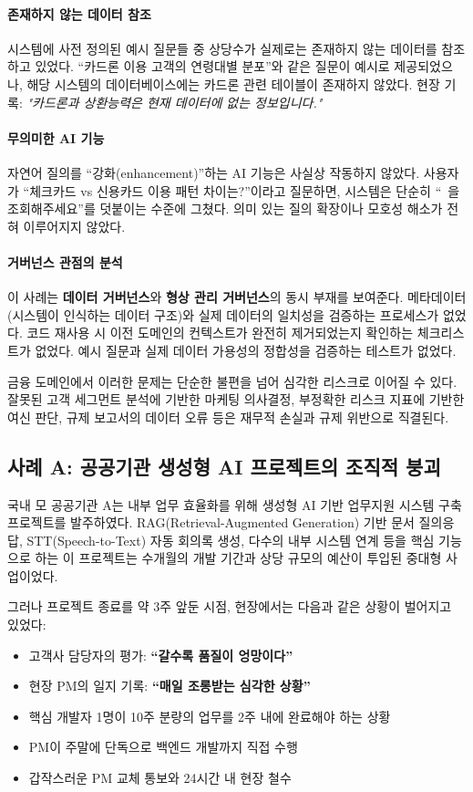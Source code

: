 \paragraph{존재하지 않는 데이터 참조}
시스템에 사전 정의된 예시 질문들 중 상당수가 실제로는 존재하지 않는 데이터를 참조하고 있었다. ``카드론 이용 고객의 연령대별 분포''와 같은 질문이 예시로 제공되었으나, 해당 시스템의 데이터베이스에는 카드론 관련 테이블이 존재하지 않았다. 현장 기록: \textit{"카드론과 상환능력은 현재 데이터에 없는 정보입니다."}

\paragraph{무의미한 AI 기능}
자연어 질의를 ``강화(enhancement)''하는 AI 기능은 사실상 작동하지 않았다. 사용자가 ``체크카드 vs 신용카드 이용 패턴 차이는?''이라고 질문하면, 시스템은 단순히 ``~을 조회해주세요''를 덧붙이는 수준에 그쳤다. 의미 있는 질의 확장이나 모호성 해소가 전혀 이루어지지 않았다.

\paragraph{거버넌스 관점의 분석}
이 사례는 \textbf{데이터 거버넌스}와 \textbf{형상 관리 거버넌스}의 동시 부재를 보여준다. 메타데이터(시스템이 인식하는 데이터 구조)와 실제 데이터의 일치성을 검증하는 프로세스가 없었다. 코드 재사용 시 이전 도메인의 컨텍스트가 완전히 제거되었는지 확인하는 체크리스트가 없었다. 예시 질문과 실제 데이터 가용성의 정합성을 검증하는 테스트가 없었다.

금융 도메인에서 이러한 문제는 단순한 불편을 넘어 심각한 리스크로 이어질 수 있다. 잘못된 고객 세그먼트 분석에 기반한 마케팅 의사결정, 부정확한 리스크 지표에 기반한 여신 판단, 규제 보고서의 데이터 오류 등은 재무적 손실과 규제 위반으로 직결된다.

\subsection{사례 A: 공공기관 생성형 AI 프로젝트의 조직적 붕괴}
\label{sec:1.3.3}

국내 모 공공기관 A는 내부 업무 효율화를 위해 생성형 AI 기반 업무지원 시스템 구축 프로젝트를 발주하였다. RAG(Retrieval-Augmented Generation) 기반 문서 질의응답, STT(Speech-to-Text) 자동 회의록 생성, 다수의 내부 시스템 연계 등을 핵심 기능으로 하는 이 프로젝트는 수개월의 개발 기간과 상당 규모의 예산이 투입된 중대형 사업이었다.

그러나 프로젝트 종료를 약 3주 앞둔 시점, 현장에서는 다음과 같은 상황이 벌어지고 있었다:
\begin{itemize}
    \item 고객사 담당자의 평가: \textbf{``갈수록 품질이 엉망이다''}
    \item 현장 PM의 일지 기록: \textbf{``매일 조롱받는 심각한 상황''}
    \item 핵심 개발자 1명이 10주 분량의 업무를 2주 내에 완료해야 하는 상황
    \item PM이 주말에 단독으로 백엔드 개발까지 직접 수행
    \item 갑작스러운 PM 교체 통보와 24시간 내 현장 철수
\end{itemize}

